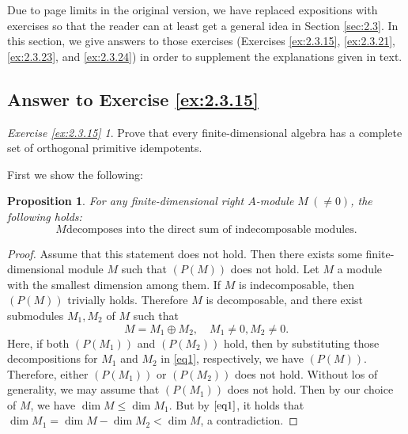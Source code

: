 \documentclass{surv-l}
\numberwithin{equation}{chapter}
\numberwithin{figure}{chapter}
\theoremstyle{plain}
\newtheorem{prp}[thm]{Proposition}
\theoremstyle{definition}
\theoremstyle{remark}
\begin{document}
Due to page limits in the original version, 
we have replaced expositions
with exercises so that the reader can at least get a general idea
in Section
\ref{sec:2.3}. %
In this section, we give answers to those exercises
(Exercises \ref{ex:2.3.15}, \ref{ex:2.3.21}, \ref{ex:2.3.23}, and \ref{ex:2.3.24})
in order to supplement the explanations given in text.

\subsection{Answer to Exercise \protect\ref{ex:2.3.15}}\label{qtn:2.2}\label{sec:exc2.3.15}
\newtheorem*{exc15}{Exercise \ref{ex:2.3.15}}
\begin{exc15}
Prove that every finite-dimensional algebra has a complete set of orthogonal primitive idempotents.
\end{exc15}

First we show the following:

\begin{prp}\label{prp:PM}
For any finite-dimensional right $A$-module $M\ (\ne 0)$, the following holds:
\begin{equation}\tag{$P(M)$}
M \text{decomposes into the direct sum of indecomposable modules.}
\end{equation}
\end{prp}

\begin{proof}
Assume that this statement does not hold.
Then there exists some finite-dimensional module $M$ such that
$(P(M))$ does not hold.
Let $M$ a module with the smallest dimension among them.
If $M$ is indecomposable, then $(P(M))$ trivially holds.
Therefore $M$ is decomposable, and there exist submodules $M_1, M_2$ of $M$
such that
\begin{equation}\label{eq1}
M = M_1 \oplus M_2, \quad M_1 \ne 0, M_2 \ne 0.
\end{equation}
Here, if both $(P(M_1))$ and $(P(M_2))$ hold, then by substituting those decompositions
for $M_1$ and $M_2$ in \eqref{eq1}, respectively, we have $(P(M))$.
Therefore, either $(P(M_1))$ or $(P(M_2))$ does not hold.
Without los of generality, we may assume that $(P(M_1))$ does not hold.
Then by our choice of $M$, we have $\dim M \le \dim M_1$.
But by $\eqref{eq1}$, it holds that $\dim M_1 = \dim M - \dim M_2 < \dim M$, a contradiction.
\end{proof}
\end{document}
